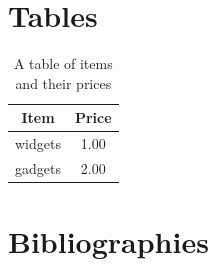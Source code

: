 \documentclass[12pt]{article}
\begin{document}
\section{Tables}
\begin{table}[ht]
\centering
\begin{tabular}{|c|c|}
    Item & Price \\\hline
    widgets & 1.00 \\
    gadgets & 2.00 \\
\end{tabular}
\caption{\label{tab:widgets}A table of items and their prices}
\end{table}
\newpage

\section{Bibliographies}
\cite{TestBook}
\cite{TestArticle}




\newpage
\end{document}
